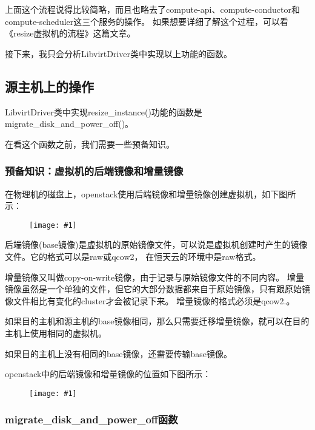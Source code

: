\documentclass[a4paper,left=1.5cm,right=1.5cm,11pt]{article}
\newcommand{\fic}[1]{\begin{figure}[H]
		\center
		\texttt{[image: \#1]}
	\end{figure}}
\begin{document}
	上面这个流程说得比较简略，而且也略去了compute-api、compute-conductor和compute-scheduler这三个服务的操作。
	如果想要详细了解这个过程，可以看《resize虚拟机的流程》这篇文章。\par

	接下来，我只会分析LibvirtDriver类中实现以上功能的函数。

\subsection{源主机上的操作}
	LibvirtDriver类中实现resize\_instance()功能的函数是migrate\_disk\_and\_power\_off()。\par

	在看这个函数之前，我们需要一些预备知识。

\subsubsection{预备知识：虚拟机的后端镜像和增量镜像}
	在物理机的磁盘上，openstack使用后端镜像和增量镜像创建虚拟机，如下图所示：
	\fic{4.png}

	后端镜像(base镜像)是虚拟机的原始镜像文件，可以说是虚拟机创建时产生的镜像文件。它的格式可以是raw或qcow2，
	在恒天云的环境中是raw格式。\par

	增量镜像又叫做copy-on-write镜像，由于记录与原始镜像文件的不同内容。
	增量镜像虽然是一个单独的文件，但它的大部分数据都来自于原始镜像，只有跟原始镜像文件相比有变化的cluster才会被记录下来。
	增量镜像的格式必须是qcow2.。\par

	如果目的主机和源主机的base镜像相同，那么只需要迁移增量镜像，就可以在目的主机上使用相同的虚拟机。\par

	如果目的主机上没有相同的base镜像，还需要传输base镜像。\par

	openstack中的后端镜像和增量镜像的位置如下图所示：
	\fic{5.png}

\subsubsection{migrate\_disk\_and\_power\_off函数}
\end{document}
